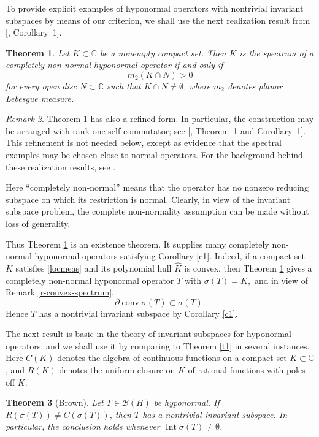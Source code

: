 \documentclass[11pt]{amsart}
\makeatletter
\numberwithin{equation}{section}
\newtheorem{theorem}{Theorem}[section]
\theoremstyle{definition}
\theoremstyle{remark}
\newtheorem{remark}[theorem]{Remark}
\newcommand{\loccite}[2]{[\@ifundefined{b@#2}{\textbf{??}}{\csname b@#2\endcsname}, #1]}
\DeclareMathOperator{\conv}{conv}
\newcommand{\CC}{\mathbb{C}}
\newcommand{\BH}{\mathcal B(H)}
\makeatother
\begin{document}
To provide explicit examples of hyponormal operators with nontrivial invariant subspaces by means of our criterion, we shall use the next realization result from \loccite{Corollary~1}{CP1}.
\begin{theorem}\label{p-putnam-realization}
Let $K\subset\CC$ be a nonempty compact set. Then $K$ is the spectrum of a completely non-normal hyponormal operator if and only if
\begin{equation}\label{locmeas}
    m_2(K\cap N)>0
\end{equation}
for every open disc $N\subset\CC$ such that $K\cap N\ne\emptyset$, where $m_2$ denotes planar Lebesgue measure.
\end{theorem}
\begin{remark}
\label{r-carey-pincus}
Theorem \ref{p-putnam-realization} has also a refined form.
In particular, the construction may be arranged with
rank-one self-commutator; see \loccite{Theorem~1 and Corollary~1}{CP1}.
This refinement is not needed below, except as evidence that the spectral
examples may be chosen close to normal operators. For the background behind these realization results, see \cite[Chs.~IX--XI]{MP}.
\end{remark}
Here ``completely non-normal'' means that the operator has no nonzero reducing subspace on which its restriction is normal.
Clearly, in view of the invariant subspace problem,
 the complete non-normality assumption can be made without loss of generality.

Thus Theorem \ref{p-putnam-realization} is an existence theorem.
It supplies many completely non-normal hyponormal operators satisfying Corollary \ref{c1}. Indeed, if a compact set $K$ satisfies \eqref{locmeas} 
and its polynomial hull $\widehat K$ is convex, then Theorem \ref{p-putnam-realization} gives a completely non-normal hyponormal operator $T$ with
$
    \sigma(T)=K,
$
and in view of Remark \ref{r-convex-spectrum}, 
$$
    \partial\conv\sigma(T)\subset\sigma(T).
$$
Hence $T$ has a nontrivial invariant subspace by Corollary \ref{c1}. 


The next result is basic in the theory of invariant subspaces for hyponormal operators,
and we shall use it by comparing to Theorem \ref{t1} in several instances.
Here $C(K)$ denotes the algebra of continuous functions on a compact set
$K\subset\CC$, and $R(K)$ denotes the uniform closure on $K$ of rational
functions with poles off $K$.
\begin{theorem}[Brown]\label{thm:brown}
Let $T\in \BH$ be  hyponormal. If $R(\sigma(T))\ne C(\sigma(T))$, then $T$ has a nontrivial invariant subspace. In particular, the conclusion holds whenever $\operatorname{Int}\sigma(T)\ne\emptyset$.
\end{theorem}
\end{document}
